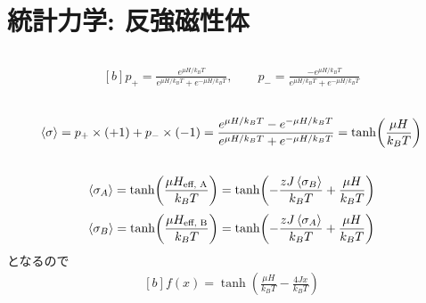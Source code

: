 \documentclass[../../sp_2016.tex]{subfiles}
\begin{document}
\section{統計力学: 反強磁性体}
\subsection{}
\begin{equation}\begin{aligned}[b]
    p_+ = \frac{e^{\mu H/k_BT}}{e^{\mu H/k_BT}+e^{-\mu H/k_BT}},\qquad
    p_- = \frac{-e^{\mu H/k_BT}}{e^{\mu H/k_BT}+e^{-\mu H/k_BT}}
\end{aligned}\end{equation}

\subsection{}
\begin{equation}\begin{aligned}[b]
    \ev{\sigma} = p_+ \times (+1) + p_- \times(-1)
    = \frac{e^{\mu H/k_BT}-e^{-\mu H/k_BT}}{e^{\mu H/k_BT}+e^{-\mu H/k_BT}}
    =\tanh(\frac{\mu H}{k_BT})
\end{aligned}\end{equation}

\subsection{}
\begin{equation}\begin{aligned}[b]
    \ev{\sigma_A}
    = \tanh(\frac{\mu H_{\text{eff, A}}}{k_BT})
    = \tanh(-\frac{zJ\ev{\sigma_B}}{k_BT}+\frac{\mu H}{k_BT})
\end{aligned}\end{equation}
\begin{equation}\begin{aligned}[b]
    \ev{\sigma_B}
    = \tanh(\frac{\mu H_{\text{eff, B}}}{k_BT})
    = \tanh(-\frac{zJ\ev{\sigma_A}}{k_BT}+\frac{\mu H}{k_BT})
\end{aligned}\end{equation}
となるので
\begin{equation}\begin{aligned}[b]
    f(x) = \tanh(\frac{\mu H}{k_BT}-\frac{4Jx}{k_BT})
\end{aligned}\end{equation}
\end{document}
